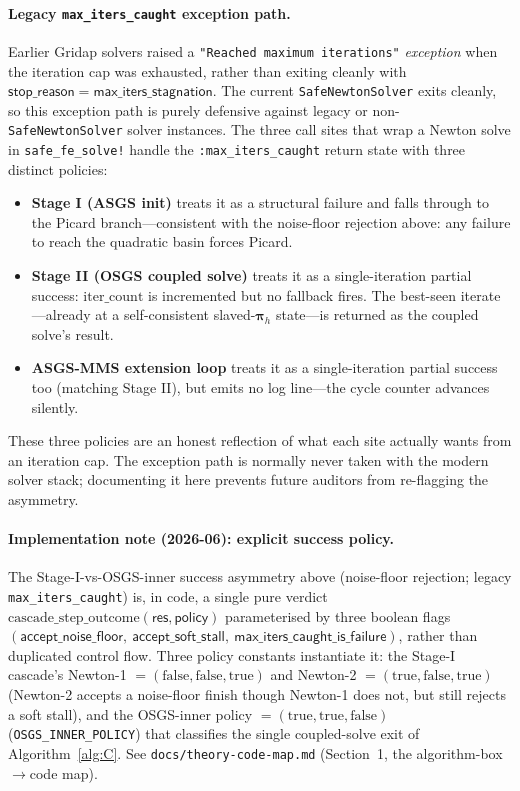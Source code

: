 \documentclass{article}
\newcommand{\code}[1]{\texttt{\small #1}}
\begin{document}
\paragraph{Legacy \texttt{max\_iters\_caught} exception path.}  Earlier
Gridap solvers raised a \texttt{"Reached maximum iterations"}
\emph{exception} when the iteration cap was exhausted, rather than
exiting cleanly with $\mathsf{stop\_reason} = \mathsf{max\_iters\_stagnation}$.
The current \code{SafeNewtonSolver} exits cleanly, so this exception
path is purely defensive against legacy or non-\code{SafeNewtonSolver}
solver instances. The three call sites that wrap a Newton solve in
\code{safe\_fe\_solve!} handle the \code{:max\_iters\_caught} return
state with three distinct policies:
\begin{itemize}\itemsep0pt
\item \textbf{Stage I (ASGS init)} treats it as a structural failure
  and falls through to the Picard branch---consistent with the noise-floor
  rejection above: any failure to reach the quadratic basin forces
  Picard.
\item \textbf{Stage II (OSGS coupled solve)} treats it as a
  single-iteration partial success: $\mathrm{iter\_count}$ is
  incremented but no fallback fires. The best-seen iterate---already at
  a self-consistent slaved-$\boldsymbol{\pi}_h$ state---is returned as
  the coupled solve's result.
\item \textbf{ASGS-MMS extension loop} treats it as a single-iteration
  partial success too (matching Stage II), but emits no log line---the
  cycle counter advances silently.
\end{itemize}
These three policies are an honest reflection of what each site
actually wants from an iteration cap. The exception path is normally
never taken with the modern solver stack; documenting it here prevents
future auditors from re-flagging the asymmetry.

\paragraph{Implementation note (2026-06): explicit success policy.}
The Stage-I-vs-OSGS-inner success asymmetry above (noise-floor rejection; legacy
\texttt{max\_iters\_caught}) is, in code, a single pure verdict
$\mathrm{cascade\_step\_outcome}(\mathsf{res}, \mathsf{policy})$ parameterised by
three boolean flags
$(\mathsf{accept\_noise\_floor},\ \mathsf{accept\_soft\_stall},\ \mathsf{max\_iters\_caught\_is\_failure})$,
rather than duplicated control flow. Three policy constants instantiate it:
the Stage-I cascade's Newton-1 $=(\mathrm{false},\mathrm{false},\mathrm{true})$ and Newton-2
$=(\mathrm{true},\mathrm{false},\mathrm{true})$ (Newton-2 accepts a noise-floor finish though
Newton-1 does not, but still rejects a soft stall), and the OSGS-inner policy
$=(\mathrm{true},\mathrm{true},\mathrm{false})$ (\code{OSGS\_INNER\_POLICY}) that classifies the
single coupled-solve exit of Algorithm~\ref{alg:C}. See
\code{docs/theory-code-map.md} (Section~1, the algorithm-box$\rightarrow$code map).
\end{document}

